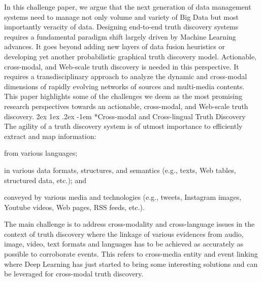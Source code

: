 \documentclass[prodmode,acmtecs]{acmsmall} %
\makeatletter
\renewcommand\paragraph{\@startsection{paragraph}{5}{\z@}%
                                       {2ex \@plus1ex \@minus .2ex}%
                                       {-1em}%
                                      {\sffamily\normalsize\bfseries}}
\makeatother
\begin{document}
 In this challenge paper, we argue that the next generation of data management systems need to 
 manage not only volume and variety of Big Data but most importantly veracity of data. Designing
 end-to-end truth discovery systems requires a fundamental paradigm shift largely driven by Machine Learning advances.
 It goes beyond adding new layers of data fusion heuristics or developing yet another probabilistic graphical truth discovery model. 
 Actionable, cross-modal, and Web-scale truth discovery is needed in this perspective. It requires a transdisciplinary approach to
 analyze the dynamic and cross-modal dimensions of rapidly evolving networks of sources and multi-media contents. 
This paper highlights some of the challenges we deem as the most promising research perspectives towards an actionable, cross-modal, 
and Web-scale truth discovery.
%
\paragraph*{Cross-modal and Cross-lingual Truth Discovery} 
The agility of a truth discovery system is of utmost importance to efficiently extract and map information: 
\begin{inparaenum}[(i)]
\item from various languages;
\item in various data formats, structures, and semantics (e.g., texts, Web tables, structured data, etc.); and
\item  conveyed by various media and technologies (e.g., tweets, Instagram images, Youtube videos, Web pages, RSS feeds, etc.).
\end{inparaenum}
The main challenge is to address cross-modality and cross-language issues in the context of truth discovery where the linkage of various 
evidences from audio, image, video, text formats and languages has to be achieved as accurately as possible to corroborate events. This refers
to cross-media entity and event linking where Deep Learning has just started to bring some interesting solutions and can be leveraged for
cross-modal truth discovery.
%
\end{document}
